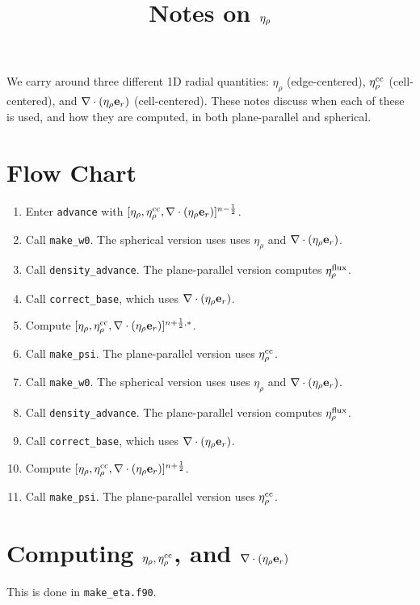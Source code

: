 \documentclass[11pt]{article}
\title{Notes on $\etarho$}
\def\half   {\frac{1}{2}}
\def\eb         {{\bf e}}
\def\etarho     {\eta_\rho}
\def\etarhocc   {\etarho^{\rm cc}}
\def\etarhoflux {\etarho^{\rm flux}}
\def\divetarho  {\nabla\cdot(\etarho\eb_r)}
\begin{document}
\maketitle
\tableofcontents
\clearpage

We carry around three different 1D radial quantities: $\etarho$ (edge-centered), $\etarhocc$ (cell-centered), and $\divetarho$ (cell-centered).  These notes discuss when each of these is used, and how they are computed, in both plane-parallel and spherical.

\section{Flow Chart}
\begin{enumerate}
\item Enter {\tt advance} with $[\etarho, \etarhocc, \divetarho]^{n-\half}$.
\item Call {\tt make\_w0}.  The spherical version uses uses $\etarho$ and $\divetarho$.
\item Call {\tt density\_advance}.  The plane-parallel version computes $\etarhoflux$.
\item Call {\tt correct\_base}, which uses $\divetarho$.
\item Compute $[\etarho, \etarhocc, \divetarho]^{n+\half,*}$.
\item Call {\tt make\_psi}.  The plane-parallel version uses $\etarhocc$.
\item Call {\tt make\_w0}.  The spherical version uses uses $\etarho$ and $\divetarho$.
\item Call {\tt density\_advance}.  The plane-parallel version computes $\etarhoflux$.
\item Call {\tt correct\_base}, which uses $\divetarho$.
\item Compute $[\etarho, \etarhocc, \divetarho]^{n+\half}$.
\item Call {\tt make\_psi}.  The plane-parallel version uses $\etarhocc$.
\end{enumerate}

\section{Computing $\etarho, \etarhocc$, and $\divetarho$}
This is done in {\tt make\_eta.f90}.
\end{document}

